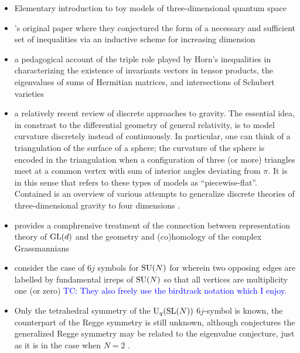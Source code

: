 \documentclass[notitlepage, 10pt]{article}
\begin{document}
\begin{itemize}
    \item Elementary introduction to toy models of three-dimensional quantum space \cite{barrett2003geometrical}
    \item {}'s original paper where they conjectured the form of a necessary and sufficient set of inequalities via an inductive scheme for increasing dimension \cite{horn1962eigenvalues}
    \item \citeauthor{berline2018horn} a pedagogical account of the triple role played by Horn's inequalities in characterizing the existence of invariants vectors in tensor products, the eigenvalues of sums of Hermitian matrices, and intersections of Schubert varieties \cite{berline2018horn}
    \item \citeauthor{regge2000discrete} \cite{regge2000discrete} a relatively recent review of discrete approaches to gravity. 
        The essential idea, in constrast to the differential geometry of general relativity, is to model curvature discretely instead of continuously. 
        In particular, one can think of a triangulation of the surface of a sphere; the curvature of the sphere is encoded in the triangulation when a configuration of three (or more) triangles meet at a common vertex with sum of interior angles deviating from $\pi$.
        It is in this sense that \citeauthor{regge2000discrete} refers to these types of models as ``piecewise-flat''.
        Contained is an overview of various attempts to generalize discrete theories of three-dimensional gravity to four dimensions \cite[Section III]{regge2000discrete}.
    \item \citeauthor{fulton1997young} provides a comphrensive treatment of the connection between representation theory of $\operatorname{GL}(d)$ and the geometry and (co)homology of the complex Grassmannians \cite{fulton1997young}
    \item \citeauthor{alcockspecial} consider the case of $6j$ symbols for $\operatorname{SU}(N)$ for wherein two opposing edges are labelled by fundamental irreps of $\operatorname{SU}(N)$ so that all vertices are multiplicity one (or zero) \cite{alcockspecial} \textcolor{blue}{TC: They also freely use the birdtrack notation which I enjoy.}
    \item Only the tetrahedral symmetry of the $\operatorname{U}_q(\operatorname{SL}(N))$ $6j$-symbol is known, the counterpart of the Regge symmetry is still unknown, although \citeauthor{morozov2018new} conjectures the generalized Regge symmetry may be related to the eigenvalue conjecture, just as it is in the case when $N=2$ \cite{morozov2018new}.

\end{itemize}
\end{document}
